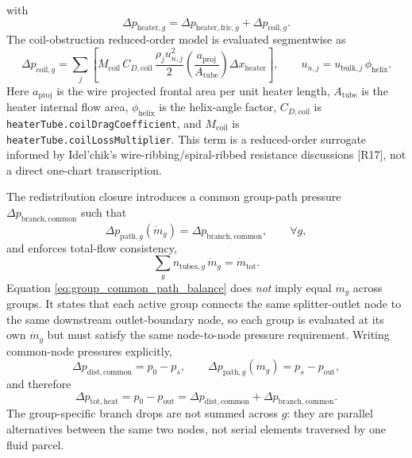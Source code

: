 \documentclass[11pt]{article}
\begin{document}
with
\begin{equation}
\label{eq:group_heater_split_dp}
\Delta p_{\mathrm{heater},g}=\Delta p_{\mathrm{heater,fric},g}+\Delta p_{\mathrm{coil},g}.
\end{equation}
The coil-obstruction reduced-order model is evaluated segmentwise as
\begin{equation}
\label{eq:group_coil_dp_model}
\Delta p_{\mathrm{coil},g}=\sum_j
\left[
M_{\mathrm{coil}}\,C_{D,\mathrm{coil}}\,\frac{\rho_j u_{n,j}^2}{2}
\left(\frac{a_{\mathrm{proj}}}{A_{\mathrm{tube}}}\right)\Delta x_{\mathrm{heater}}
\right],
\qquad
u_{n,j}=u_{\mathrm{bulk},j}\,\phi_{\mathrm{helix}}.
\end{equation}
Here \(a_{\mathrm{proj}}\) is the wire projected frontal area per unit heater length, \(A_{\mathrm{tube}}\) is the heater internal flow area, \(\phi_{\mathrm{helix}}\) is the helix-angle factor, \(C_{D,\mathrm{coil}}\) is \texttt{heaterTube.coilDragCoefficient}, and \(M_{\mathrm{coil}}\) is \texttt{heaterTube.coilLossMultiplier}. This term is a reduced-order surrogate informed by Idel'chik's wire-ribbing/spiral-ribbed resistance discussions [R17], not a direct one-chart transcription.

The redistribution closure introduces a common group-path pressure \(\Delta p_{\mathrm{branch,common}}\) such that
\begin{equation}
\label{eq:group_common_path_balance}
\Delta p_{\mathrm{path},g}(\dot m_g)=\Delta p_{\mathrm{branch,common}},\qquad \forall g,
\end{equation}
and enforces total-flow consistency,
\begin{equation}
\label{eq:group_total_flow_constraint}
\sum_g n_{\mathrm{tubes},g}\,\dot m_g=\dot m_{\mathrm{tot}}.
\end{equation}
Equation \eqref{eq:group_common_path_balance} does \emph{not} imply equal \(\dot m_g\) across groups. It states that each active group connects the same splitter-outlet node to the same downstream outlet-boundary node, so each group is evaluated at its own \(\dot m_g\) but must satisfy the same node-to-node pressure requirement. Writing common-node pressures explicitly,
\begin{equation}
\label{eq:group_node_pressures}
\Delta p_{\mathrm{dist,common}}=p_0-p_s,\qquad
\Delta p_{\mathrm{path},g}(\dot m_g)=p_s-p_{\mathrm{out}},
\end{equation}
and therefore
\begin{equation}
\label{eq:group_path_node_drop}
\Delta p_{\mathrm{tot,heat}}=p_0-p_{\mathrm{out}}=
\Delta p_{\mathrm{dist,common}}+\Delta p_{\mathrm{branch,common}}.
\end{equation}
The group-specific branch drops are not summed across \(g\): they are parallel alternatives between the same two nodes, not serial elements traversed by one fluid parcel.
\end{document}
